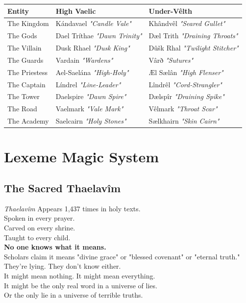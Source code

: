 \documentclass[11pt,a4paper,twoside]{book}
\begin{document}
\begin{adjustwidth}{0em}{0em}
\small
\begin{tabularx}{\textwidth}{X|X|X}
\textbf{Entity} & \textbf{High Vaelic} & \textbf{Under-Vêlth} \\
\hline
The Kingdom & Kándavael \textit{"Candle Vale"} & Khândvêl \textit{"Seared Gullet"} \\
The Gods & Dael Tríthae \textit{"Dawn Trinity"} & Dæl Trith \textit{"Draining Throats"} \\
The Villain & Dusk Rhael \textit{"Dusk King"} & Dûšk Rhal \textit{"Twilight Stitcher"} \\
The Guards & Vardain \textit{"Wardens"} & Vârð \textit{"Sutures"} \\
The Priestess & Ael-Saelána \textit{"High-Holy"} & Æl Sælân \textit{"High Flenser"} \\
The Captain & Líndrel \textit{"Line-Leader"} & Lîndrêl \textit{"Cord-Strangler"} \\
The Tower & Daelspire \textit{"Dawn Spire"} & Dælspîr \textit{"Draining Spike"} \\
The Road & Vaelmark \textit{"Vale Mark"} & Vêlmark \textit{"Throat Scar"} \\
The Academy & Saelcairn \textit{"Holy Stones"} & Sælkhairn \textit{"Skin Cairn"} \\
\end{tabularx}
\end{adjustwidth}

\chapter{Lexeme Magic System}

\section{The Sacred Thaelavîm}

\begin{tcolorbox}[codexbox={The Untranslatable}]
\centering
\Large\textit{Thaelavîm}
\normalsize
\vspace{0.5em}
Appears 1,437 times in holy texts.\\
Spoken in every prayer.\\
Carved on every shrine.\\
Taught to every child.\\
\vspace{0.5em}
\textbf{No one knows what it means.}\\
\vspace{0.5em}
Scholars claim it means "divine grace" or "blessed covenant" or "eternal truth."\\
They're lying. They don't know either.\\
It might mean nothing. It might mean everything.\\
It might be the only real word in a universe of lies.\\
Or the only lie in a universe of terrible truths.
\end{tcolorbox}
\end{document}

